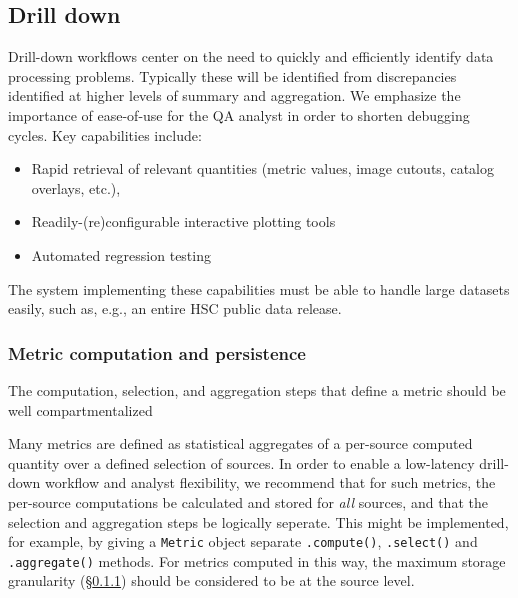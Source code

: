 
\subsection{Drill down} \label{sec:drill-down-design}


Drill-down workflows center on the need to quickly and efficiently identify data processing problems.
Typically these will be identified from discrepancies identified at higher levels of summary and aggregation.
We emphasize the importance of ease-of-use for the QA analyst in order to shorten debugging cycles.
Key capabilities include:

\begin{itemize}
	\item Rapid retrieval of relevant quantities (metric values, image cutouts, catalog overlays, etc.),
	\item Readily-(re)configurable interactive plotting tools
	\item Automated regression testing
\end{itemize}

The system implementing these capabilities must be able to handle large datasets easily, such as, e.g., an entire HSC public data release.

\subsubsection{Metric computation and persistence} \label{sec:metric_storage}

\begin{recommendation} \label{sec:metric_computation}
The computation, selection, and aggregation steps that define a metric should be well compartmentalized
\end{recommendation}

Many metrics are defined as statistical aggregates of a per-source computed quantity over a defined selection of sources.
In order to enable a low-latency drill-down workflow and analyst flexibility, we recommend that for such metrics, the per-source computations be calculated and stored for \emph{all} sources, and that the selection and aggregation steps be logically seperate.
This might be implemented, for example, by giving a \texttt{Metric} object separate \texttt{.compute()}, \texttt{.select()} and \texttt{.aggregate()} methods.
For metrics computed in this way, the maximum storage granularity (\S \ref{sec:metric_storage}) should be considered to be at the source level.

